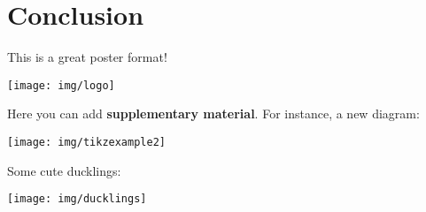 \documentclass[a0paper,fleqn]{betterposter}
\begin{document}
{\section{Conclusion}
This is a great poster format!

\vfill

\texttt{[image: img/logo]}\\

}{

Here you can add \textbf{supplementary material}. For instance, a new diagram:
\begin{center}
\texttt{[image: img/tikzexample2]}
\end{center}

Some cute ducklings:
\begin{center}
\texttt{[image: img/ducklings]}
\end{center}
}
\end{document}
